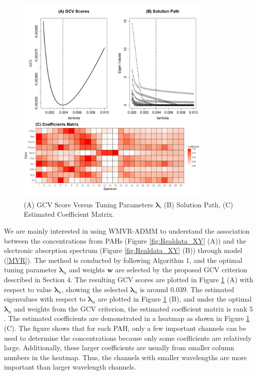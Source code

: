 \documentclass[alpha-refs]{wiley-article}
\begin{document}
\begin{figure}[hbt!]
    \centering
    \includegraphics[width = 95mm]{Figure/S6_P2.pdf}
    \caption{(A) GCV Score Versus Tuning Parameters $\boldsymbol{\lambda}$, (B) Solution Path, (C) Estimated Coefficient Matrix.}
    \label{fig:Realdata_GCV}
\end{figure}

We are mainly interested in using WMVR-ADMM to understand the association between the concentrations from PAHs (Figure
\ref{fig:Realdata_XY} (A)) and the electronic absorption spectrum  (Figure \ref{fig:Realdata_XY} (B)) through model (\ref{MVR}). The method is conducted by following Algorithm 1, and the optimal tuning parameter $\boldsymbol{\lambda}_{n}$ and weights $\boldsymbol{w}$ are selected by the proposed GCV criterion described in Section 4.
The resulting GCV scores are plotted in Figure \ref{fig:Realdata_GCV} (A) with respect to value $\boldsymbol{\lambda}_{n}$, showing the selected $\boldsymbol{\lambda}_{n}$ is around $0.039$.
The estimated eigenvalues with respect to $\boldsymbol{\lambda}_{n}$ are plotted in Figure \ref{fig:Realdata_GCV} (B), and under the optimal $\boldsymbol{\lambda}_{n}$ and weights from the GCV criterion, the estimated coefficient matrix is rank $5$.
The estimated coefficients are demonstrated in a heatmap as shown in Figure \ref{fig:Realdata_GCV} (C).
The figure shows that for each PAH, only a few important channels can be used to determine the concentrations because only some coefficients are relatively large.
Additionally, these larger coefficients are usually from smaller column numbers in the heatmap.
Thus, the channels with smaller wavelengths are more important than larger wavelength channels.
\end{document}
